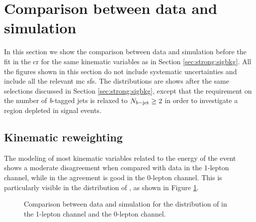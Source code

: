 %
\section{Comparison between data and simulation}
\label{sec:strong:dataMC}
In this section we show the comparison between data and simulation before the fit in the \gls{cr}
for the same kinematic variables as in Section \ref{sec:strong:sigbkg}. 
All the figures shown in this section do not include systematic uncertainties and include all the relevant \gls{mc} \glspl{sf}. 
The distributions are shows after the same selections discussed in Section \ref{sec:strong:sigbkg}, 
except that the requirement on the number
of \textit{b}-tagged jets is relaxed to $N_{b\mathrm{-jet}} \geq 2$ 
in order to investigate a region depleted in signal events. 

\subsection{Kinematic reweighting}
\label{sec:strong:kinrw}

The modeling of most kinematic variables related to the energy of the event shows a moderate disagreement 
when compared with data in the 1-lepton channel, while in the agreement is good in the 0-lepton channel. 
This is particularly visible in the distribution of \meff, as shown in Figure \ref{fig:strong:datamc:meff_prerw}.

\begin{figure}[h]
\centering 
{}
\caption{Comparison between data and simulation for the distribution of \meff in  the 1-lepton channel and 
the 0-lepton channel.
}
\label{fig:strong:datamc:meff_prerw}
\end{figure}

